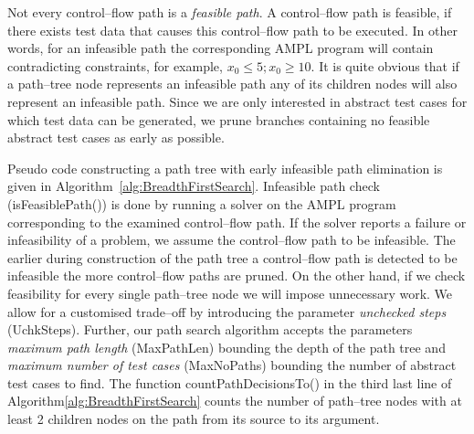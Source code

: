 \documentclass[runningheads,a4paper]{llncs}%
\begin{document}
Not every control--flow path is a \emph{feasible path}. A control--flow path is
feasible, if there exists test data that causes this control--flow path to be
executed. In other words, for an infeasible path the corresponding AMPL program
will contain contradicting constraints, for example, $x_0\leq5; x_0\geq10$. It
is quite obvious that if a path--tree node represents an infeasible path any of
its children nodes will also represent an infeasible path. Since we are only
interested in abstract test cases for which test data can be generated, we prune
branches containing no feasible abstract test cases as early as possible.

Pseudo code constructing a path tree with early infeasible path elimination is
given in Algorithm~\ref{alg:BreadthFirstSearch}. Infeasible path check
(isFeasiblePath()) is done by running a solver on the AMPL program corresponding
to the examined control--flow path. If the solver reports a failure or
infeasibility of a problem, we assume the control--flow path to be infeasible.
The earlier during construction of the path tree a control--flow path is
detected to be infeasible the more control--flow paths are pruned. On the other
hand, if we check feasibility for every single path--tree node we will impose
unnecessary work. We allow for a customised trade--off by introducing the
parameter \emph{unchecked steps} (UchkSteps). Further, our path search algorithm
accepts the parameters \emph{maximum path length} (MaxPathLen) bounding the
depth of the path tree and \emph{maximum number of test cases} (MaxNoPaths)
bounding the number of abstract test cases to find. The function
countPathDecisionsTo() in the third last line of
Algorithm\ref{alg:BreadthFirstSearch} counts the number of path--tree nodes with
at least 2 children nodes on the path from its source to its argument.%
\end{document}
